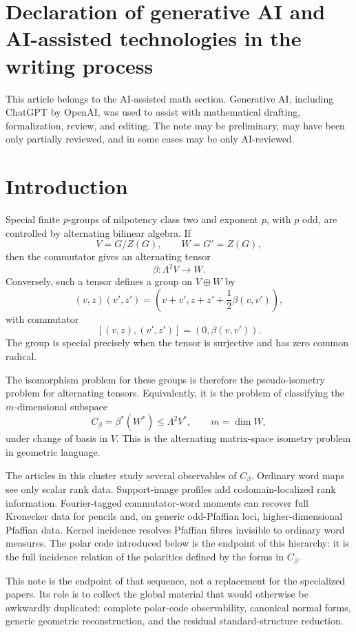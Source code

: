 \documentclass[11pt]{article}
\begin{document}
\section*{Declaration of generative AI and AI-assisted technologies in the writing process}
This article belongs to the AI-assisted math section. Generative AI, including ChatGPT by \mbox{OpenAI}, was used to assist with mathematical drafting, formalization, review, and editing. The note may be preliminary, may have been only partially reviewed, and in some cases may be only AI-reviewed.

\section{Introduction}

Special finite $p$-groups of nilpotency class two and exponent $p$, with $p$ odd, are controlled by alternating bilinear algebra. If
\[
V=G/Z(G),
\qquad
W=G'=Z(G),
\]
then the commutator gives an alternating tensor
\[
\beta:\Lambda^2V\to W.
\]
Conversely, such a tensor defines a group on $V\oplus W$ by
\[
(v,z)(v',z')
=
\left(v+v',z+z'+\frac12\beta(v,v')\right),
\]
with commutator
\[
[(v,z),(v',z')]=(0,\beta(v,v')).
\]
The group is special precisely when the tensor is surjective and has zero common radical.

The isomorphism problem for these groups is therefore the pseudo-isometry problem for alternating tensors. Equivalently, it is the problem of classifying the $m$-dimensional subspace
\[
C_\beta=\beta^*(W^*)\le \Lambda^2V^*,
\qquad m=\dim W,
\]
under change of basis in $V$. This is the alternating matrix-space isometry problem in geometric language.

The articles in this cluster study several observables of $C_\beta$. Ordinary word maps see only scalar rank data. Support-image profiles add codomain-localized rank information. Fourier-tagged commutator-word moments can recover full Kronecker data for pencils and, on generic odd-Pfaffian loci, higher-dimensional Pfaffian data. Kernel incidence resolves Pfaffian fibres invisible to ordinary word measures. The polar code introduced below is the endpoint of this hierarchy: it is the full incidence relation of the polarities defined by the forms in $C_\beta$.

This note is the endpoint of that sequence, not a replacement for the specialized papers. Its role is to collect the global material that would otherwise be awkwardly duplicated: complete polar-code observability, canonical normal forms, generic geometric reconstruction, and the residual standard-structure reduction.
\end{document}
